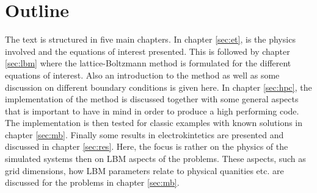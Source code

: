 \section{Outline}
The text is structured in five main chapters. In chapter \ref{sec:et},
is the physics involved and the equations of interest presented. This
is followed by chapter \ref{sec:lbm} where the lattice-Boltzmann
method is formulated for the different equations of interest. Also an
introduction to the method as well as some discussion on different
boundary conditions is given here. In chapter \ref{sec:hpc}, the
implementation of the method is discussed together with some general
aspects that is important to have in mind in order to produce a high
performing code. The implementation is then tested for classic
examples with known solutions in chapter \ref{sec:mb}. Finally some
results in electrokintetics are presented and discussed in chapter
\ref{sec:res}. Here, the focus is rather on the physics of the
simulated systems then on LBM aspects of the problems. These aspects,
such as grid dimensions, how LBM parameters relate to physical
quanities etc. are discussed for the problems in chapter \ref{sec:mb}.

